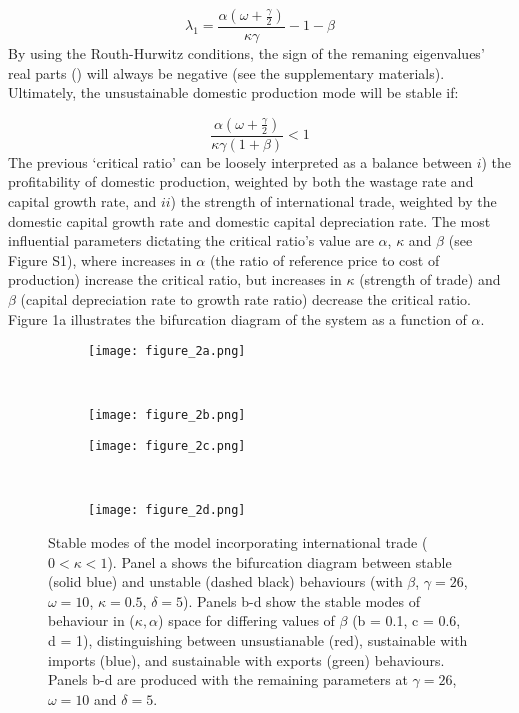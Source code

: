 \documentclass[12pt]{article}
\begin{document}
\begin{equation}
  \lambda_{1} = \frac{\alpha(\omega + \frac{\gamma}{2})}{\kappa \gamma} - 1 - \beta
\end{equation}
%
By using the Routh-Hurwitz conditions, the sign of the remaning eigenvalues' real parts (\cite{ottoday2011}) will always be negative (see the supplementary materials). Ultimately, the unsustainable domestic production mode will be stable if:

\begin{equation}
  \frac{ \alpha (\omega + \frac{\gamma}{2})}{\kappa \gamma(1+\beta)} < 1
\end{equation}
%
The previous `critical ratio' can be loosely interpreted as a balance between $i$) the profitability of domestic production, weighted by both the wastage rate and capital growth rate, and $ii$) the strength of international trade, weighted by the domestic capital growth rate and domestic capital depreciation rate. The most influential parameters dictating the critical ratio's value are $\alpha$, $\kappa$ and $\beta$ (see Figure S1), where increases in $\alpha$ (the ratio of reference price to cost of production) increase the critical ratio, but increases in $\kappa$ (strength of trade) and $\beta$ (capital depreciation rate to growth rate ratio) decrease the critical ratio. Figure 1a illustrates the bifurcation diagram of the system as a function of $\alpha$.

\begin{figure}[t!]
  \begin{subfigure}{0.5\textwidth}
      \texttt{[image: figure\_2a.png]}
  \end{subfigure}%
  ~%
  \begin{subfigure}{0.5\textwidth}
      \texttt{[image: figure\_2b.png]}
  \end{subfigure}

  \begin{subfigure}{0.5\textwidth}
      \texttt{[image: figure\_2c.png]}
  \end{subfigure}%
  ~%
  \begin{subfigure}{0.5\textwidth}
      \texttt{[image: figure\_2d.png]}
  \end{subfigure}%

  \caption{Stable modes of the model incorporating international trade ($0 < \kappa < 1$). Panel a shows the bifurcation diagram between stable (solid blue) and unstable (dashed black) behaviours (with $\beta$, $\gamma = 26$, $\omega = 10$, $\kappa = 0.5$, $\delta = 5$). Panels b-d show the stable modes of behaviour in ($\kappa, \alpha$) space for differing values of $\beta$ (b = 0.1, c = 0.6, d = 1), distinguishing between unsustianable (red), sustainable with imports (blue), and sustainable with exports (green) behaviours. Panels b-d are produced with the remaining parameters at $\gamma = 26$, $\omega = 10$ and $\delta = 5$.}
  \label{figure2}
\end{figure}
\end{document}
